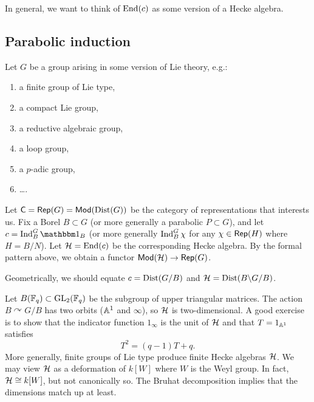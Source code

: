 \documentclass{article}
\begin{document}
In general, we want to think of $\End(c)$ as some version of a Hecke algebra.

\subsection{Parabolic induction}

Let $G$ be a group arising in some version of Lie theory, e.g.:
\begin{enumerate}
	\item a finite group of Lie type,
	\item a compact Lie group,
	\item a reductive algebraic group,
	\item a loop group,
	\item a $p$-adic group,
	\item \dots.
\end{enumerate}

Let $\Csf = \Rep(G) = \Mod(\Dist(G))$ be the category of representations that interests us.
Fix a Borel $B \subset G$ (or more generally a parabolic $P \subset G$), and let $c = \Indop_B^G \onebb_B$ (or more generally $\Ind_B^G \chi$ for any $\chi \in \Rep(H)$ where $H = B / N$).
Let $\Hc = \End(c)$ be the corresponding Hecke algebra.
By the formal pattern above, we obtain a functor $\Mod(\Hc) \to \Rep(G)$.

Geometrically, we should equate $c = \Dist(G / B)$ and $\Hc = \Dist(B \bs G / B)$.

\begin{ex}
	Let $B(\FF_q) \subset \GL_2(\FF_q)$ be the subgroup of upper triangular matrices.
	The action $B \curvearrowright G / B$ has two orbits ($\AA^1$ and $\infty$), so $\Hc$ is two-dimensional.
	A good exercise is to show that the indicator function $1_{\infty}$ is the unit of $\Hc$ and that $T = 1_{\AA^1}$ satisfies
	\[
		T^2 = (q - 1) T + q.
	\]
	More generally, finite groups of Lie type produce finite Hecke algebras $\Hc$.
	We may view $\Hc$ as a deformation of $k[W]$ where $W$ is the Weyl group.
	In fact, $\Hc \cong k[W]$, but not canonically so.
	The Bruhat decomposition implies that the dimensions match up at least.
\end{ex}
\end{document}
